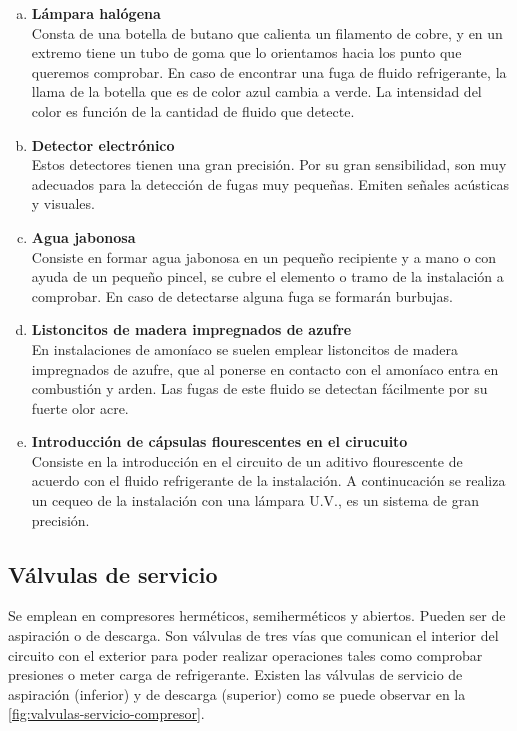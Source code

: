 \begin{enumerate}[a)]
    \item \textbf{L\'ampara hal\'ogena}\\ Consta de una botella de butano que calienta un filamento de cobre, y en un extremo tiene un tubo de goma que lo orientamos hacia los punto que queremos comprobar. En caso de encontrar una fuga de fluido refrigerante, la llama de la botella que es de color azul cambia a verde. La intensidad del color es funci\'on de la cantidad de fluido que detecte.
    \item \textbf{Detector electr\'onico}\\ Estos detectores tienen una gran precisi\'on. Por su gran sensibilidad, son muy adecuados para la detecci\'on de fugas muy pequeñas. Emiten señales ac\'usticas y visuales.
    \item \textbf{Agua jabonosa}\\ Consiste en formar agua jabonosa en un pequeño recipiente y a mano o con ayuda de un pequeño pincel, se cubre el elemento o tramo de la instalaci\'on a comprobar. En caso de detectarse alguna fuga se formar\'an burbujas.
    \item \textbf{Listoncitos de madera impregnados de azufre}\\ En instalaciones de amon\'iaco se suelen emplear listoncitos de madera impregnados de azufre, que al ponerse en contacto con el amon\'iaco entra en combusti\'on y arden. Las fugas de este fluido se detectan f\'acilmente por su fuerte olor acre.
    \item \textbf{Introducci\'on de c\'apsulas flourescentes en el cirucuito}\\ Consiste en la introducci\'on en el circuito de un aditivo flourescente de acuerdo con el fluido refrigerante de la instalaci\'on. A continucaci\'on se realiza un cequeo de la instalaci\'on con una l\'ampara U.V., es un sistema de gran precisi\'on.
\end{enumerate}

\subsection{V\'alvulas de servicio}

Se emplean en compresores herm\'eticos, semiherm\'eticos y abiertos. Pueden ser de aspiraci\'on o de descarga. Son v\'alvulas de tres v\'ias que comunican el interior del circuito con el exterior para poder realizar operaciones tales como comprobar presiones o meter carga de refrigerante. Existen las v\'alvulas de servicio de aspiraci\'on (inferior) y de descarga (superior) como se puede observar en la \autoref{fig:valvulas-servicio-compresor}.

